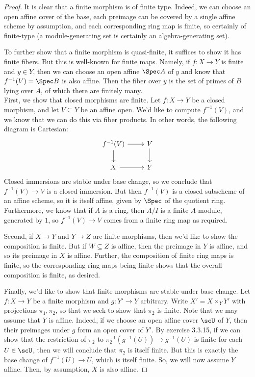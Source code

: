 \begin{proof}
	It is clear that a finite morphism is of finite type. Indeed, we can choose an open affine cover of the base, each preimage can be covered by a single affine scheme by assumption, and each corresponding ring map is finite, so certainly of finite-type (a module-generating set is certainly an algebra-generating set).
	
	To further show that a finite morphism is quasi-finite, it suffices to show it has finite fibers. But this is well-known for finite maps. Namely, if $f : X \to Y$ is finite and $y \in Y$, then we can choose an open affine $\Spec A$ of $y$ and know that $f^{-1}(V) = \Spec B$ is also affine. Then the fiber over $y$ is the set of primes of $B$ lying over $A$, of which there are finitely many. \\
	
	First, we show that closed morphisms are finite. Let $f : X \to Y$ be a closed morphism, and let $V \subseteq Y$ be an affine open. We'd like to compute $f^{-1}(V)$, and we know that we can do this via fiber products. In other words, the following diagram is Cartesian:
	\[ \begin{tikzcd} f^{-1}(V) \arrow[r] \arrow[d] & V \arrow[d] \\ X \arrow[r] & Y \end{tikzcd} \]
	Closed immersions are stable under base change, so we conclude that $f^{-1}(V) \to V$ is a closed immersion. But then $f^{-1}(V)$ is a closed subscheme of an affine scheme, so it is itself affine, given by $\Spec$ of the quotient ring. Furthermore, we know that if $A$ is a ring, then $A/I$ is a finite $A$-module, generated by $1$, so $f^{-1}(V) \to V$ comes from a finite ring map as required.
	
	Second, if $X \to Y$ and $Y \to Z$ are finite morphisms, then we'd like to show the composition is finite. But if $W \subseteq Z$ is affine, then the preimage in $Y$ is affine, and so its preimage in $X$ is affine. Further, the composition of finite ring maps is finite, so the corresponding ring maps being finite shows that the overall composition is finite, as desired.
	
	Finally, we'd like to show that finite morphisms are stable under base change. Let $f : X \to Y$ be a finite morphism and $g : Y' \to Y$ arbitrary. Write $X' = X \times_Y Y'$ with projections $\pi_1,\pi_2$, so that we seek to show that $\pi_2$ is finite. Note that we may assume that $Y$ is affine. Indeed, if we choose an open affine cover $\scU$ of $Y$, then their preimages under $g$ form an open cover of $Y'$. By exercise 3.3.15, if we can show that the restriction of $\pi_2$ to $\pi_2^{-1}(g^{-1}(U)) \to g^{-1}(U)$ is finite for each $U \in \scU$, then we will conclude that $\pi_2$ is itself finite. But this is exactly the base change of $f^{-1}(U) \to U$, which is itself finite. So, we will now assume $Y$ affine. Then, by assumption, $X$ is also affine.
	

\end{proof}
